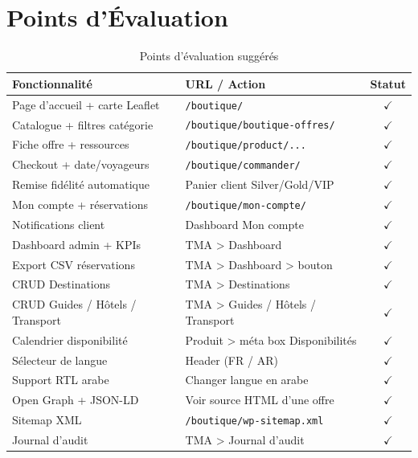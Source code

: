 \documentclass[12pt,a4paper]{report}
\begin{document}
\section{Points d'\'Evaluation}

\begin{table}[H]
\centering
\caption{Points d'\'evaluation sugg\'er\'es}
\begin{tabularx}{\linewidth}{lXc}
  \toprule
  \textbf{Fonctionnalit\'e} & \textbf{URL / Action} & \textbf{Statut} \\
  \midrule
  Page d'accueil + carte Leaflet   & \texttt{/boutique/}               & $\checkmark$ \\
  Catalogue + filtres cat\'egorie  & \texttt{/boutique/boutique-offres/} & $\checkmark$ \\
  Fiche offre + ressources         & \texttt{/boutique/product/...}    & $\checkmark$ \\
  Checkout + date/voyageurs        & \texttt{/boutique/commander/}     & $\checkmark$ \\
  Remise fid\'elit\'e automatique  & Panier client Silver/Gold/VIP     & $\checkmark$ \\
  Mon compte + r\'eservations      & \texttt{/boutique/mon-compte/}    & $\checkmark$ \\
  Notifications client             & Dashboard Mon compte              & $\checkmark$ \\
  Dashboard admin + KPIs           & TMA > Dashboard                   & $\checkmark$ \\
  Export CSV r\'eservations        & TMA > Dashboard > bouton          & $\checkmark$ \\
  CRUD Destinations                & TMA > Destinations                & $\checkmark$ \\
  CRUD Guides / H\^otels / Transport & TMA > Guides / H\^otels / Transport & $\checkmark$ \\
  Calendrier disponibilit\'e       & Produit > m\'eta box Disponibilit\'es & $\checkmark$ \\
  Sélecteur de langue              & Header (FR / AR)                  & $\checkmark$ \\
  Support RTL arabe                & Changer langue en arabe           & $\checkmark$ \\
  Open Graph + JSON-LD             & Voir source HTML d'une offre      & $\checkmark$ \\
  Sitemap XML                      & \texttt{/boutique/wp-sitemap.xml} & $\checkmark$ \\
  Journal d'audit                  & TMA > Journal d'audit             & $\checkmark$ \\
  \bottomrule
\end{tabularx}
\end{table}
\end{document}
